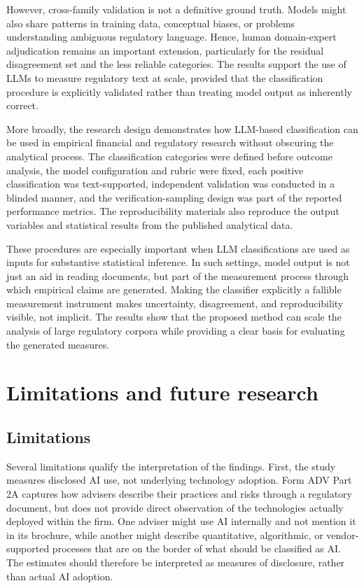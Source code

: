 \documentclass[utf8]{FrontiersinHarvard}
\begin{document}
However, cross-family validation is not a definitive ground truth. Models might also share patterns in training data, conceptual biases, or problems understanding ambiguous regulatory language. Hence, human domain-expert adjudication remains an important extension, particularly for the residual disagreement set and the less reliable categories. The results support the use of LLMs to measure regulatory text at scale, provided that the classification procedure is explicitly validated rather than treating model output as inherently correct.

More broadly, the research design demonstrates how LLM-based classification can be used in empirical financial and regulatory research without obscuring the analytical process. The classification categories were defined before outcome analysis, the model configuration and rubric were fixed, each positive classification was text-supported, independent validation was conducted in a blinded manner, and the verification-sampling design was part of the reported performance metrics. The reproducibility materials also reproduce the output variables and statistical results from the published analytical data.

These procedures are especially important when LLM classifications are used as inputs for substantive statistical inference. In such settings, model output is not just an aid in reading documents, but part of the measurement process through which empirical claims are generated. Making the classifier explicitly a fallible measurement instrument makes uncertainty, disagreement, and reproducibility visible, not implicit. The results show that the proposed method can scale the analysis of large regulatory corpora while providing a clear basis for evaluating the generated measures.

\section{Limitations and future research}

\subsection{Limitations}

Several limitations qualify the interpretation of the findings. First, the study measures disclosed AI use, not underlying technology adoption. Form ADV Part 2A captures how advisers describe their practices and risks through a regulatory document, but does not provide direct observation of the technologies actually deployed within the firm. One adviser might use AI internally and not mention it in its brochure, while another might describe quantitative, algorithmic, or vendor-supported processes that are on the border of what should be classified as AI. The estimates should therefore be interpreted as measures of disclosure, rather than actual AI adoption.
\end{document}
